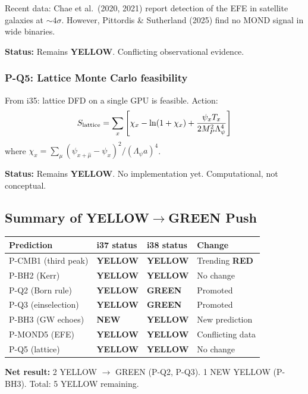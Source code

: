 \documentclass[11pt,a4paper]{article}
\newcommand{\GREEN}{\textcolor{dfdgreen}{\textbf{GREEN}}}
\newcommand{\YELLOW}{\textcolor{dfdyellow}{\textbf{YELLOW}}}
\newcommand{\RED}{\textcolor{dfdred}{\textbf{RED}}}
\newcommand{\NEW}{\textcolor{dfdblue}{\textbf{NEW}}}
\begin{document}
Recent data: Chae et al.\ (2020, 2021) report detection of the EFE in satellite galaxies at $\sim 4\sigma$. However, Pittordis \& Sutherland (2025) find no MOND signal in wide binaries.

\textbf{Status:} Remains \YELLOW. Conflicting observational evidence.

\subsubsection{P-Q5: Lattice Monte Carlo feasibility}

From i35: lattice DFD on a single GPU is feasible. Action:
\begin{equation}
S_{\rm lattice} = \sum_x \left[\chi_x - \ln(1+\chi_x) + \frac{\psi_x T_x}{2M_P^2\Lambda_\psi^4}\right]
\end{equation}
where $\chi_x = \sum_\mu (\psi_{x+\hat{\mu}} - \psi_x)^2/(\Lambda_\psi a)^4$.

\textbf{Status:} Remains \YELLOW. No implementation yet. Computational, not conceptual.

\subsection{Summary of YELLOW$\to$GREEN Push}

\begin{center}
\begin{tabular}{llll}
\toprule
\textbf{Prediction} & \textbf{i37 status} & \textbf{i38 status} & \textbf{Change} \\
\midrule
P-CMB1 (third peak) & \YELLOW & \YELLOW & Trending \RED \\
P-BH2 (Kerr) & \YELLOW & \YELLOW & No change \\
P-Q2 (Born rule) & \YELLOW & \GREEN & Promoted \\
P-Q3 (einselection) & \YELLOW & \GREEN & Promoted \\
P-BH3 (GW echoes) & \NEW & \YELLOW & New prediction \\
P-MOND5 (EFE) & \YELLOW & \YELLOW & Conflicting data \\
P-Q5 (lattice) & \YELLOW & \YELLOW & No change \\
\bottomrule
\end{tabular}
\end{center}

\textbf{Net result:} 2 YELLOW $\to$ GREEN (P-Q2, P-Q3). 1 NEW YELLOW (P-BH3). Total: 5 YELLOW remaining.


\newpage
\end{document}

